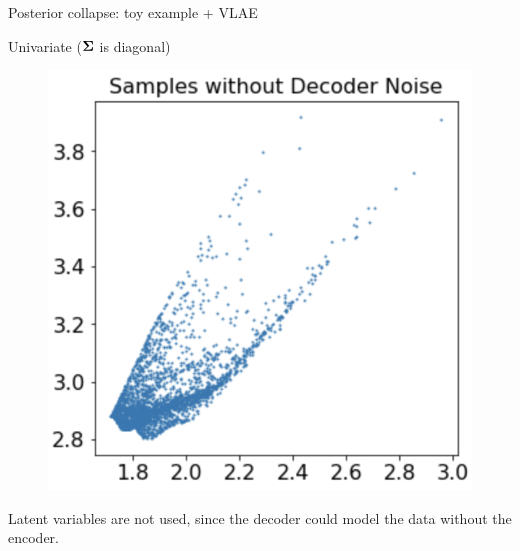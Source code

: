 \begin{frame}{Posterior collapse: toy example + VLAE}
\begin{block}{Univariate ($\boldsymbol{\Sigma}$ is diagonal)}
\begin{minipage}[t]{0.33\columnwidth}
\begin{figure}[h]
			\end{figure}
		\end{minipage}%
		\begin{minipage}[t]{0.33\columnwidth}
			\begin{figure}[h]
				\centering
				\includegraphics[width=.75\linewidth]{figs/posterior_collapse_toy_6.png}
			\end{figure}
		\end{minipage}
		Latent variables are not used, since the decoder could model the data without the encoder.
	\end{block}
\end{frame}
